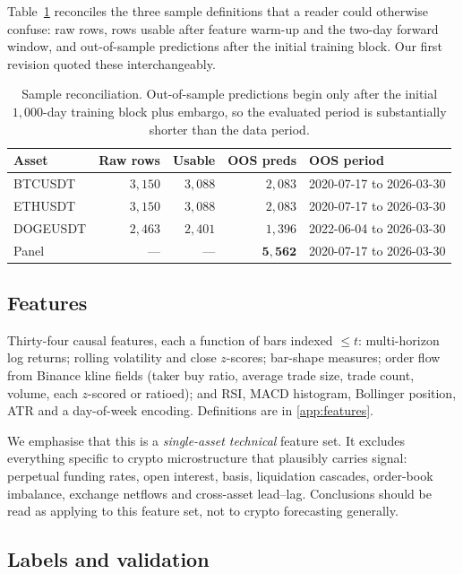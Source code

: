 \documentclass[preprint,12pt,authoryear]{elsarticle}
\begin{document}
Table~\ref{tab:data} reconciles the three sample definitions that a reader could
otherwise confuse: raw rows, rows usable after feature warm-up and the two-day
forward window, and out-of-sample predictions after the initial training block.
Our first revision quoted these interchangeably.

\begin{table}[t]\centering\small
\caption{Sample reconciliation. Out-of-sample predictions begin only after the
initial $1{,}000$-day training block plus embargo, so the evaluated period is
substantially shorter than the data period.}
\label{tab:data}
\begin{tabular}{@{}lrrrl@{}}
\toprule
Asset & Raw rows & Usable & OOS preds & OOS period \\
\midrule
BTCUSDT  & $3{,}150$ & $3{,}088$ & $2{,}083$ & 2020-07-17 to 2026-03-30 \\
ETHUSDT  & $3{,}150$ & $3{,}088$ & $2{,}083$ & 2020-07-17 to 2026-03-30 \\
DOGEUSDT & $2{,}463$ & $2{,}401$ & $1{,}396$ & 2022-06-04 to 2026-03-30 \\
\midrule
Panel    & --- & --- & $\mathbf{5{,}562}$ & 2020-07-17 to 2026-03-30 \\
\bottomrule
\end{tabular}
\end{table}

\subsection{Features}

Thirty-four causal features, each a function of bars indexed $\le t$: multi-horizon
log returns; rolling volatility and close $z$-scores; bar-shape measures; order
flow from Binance kline fields (taker buy ratio, average trade size, trade count,
volume, each $z$-scored or ratioed); and RSI, MACD histogram, Bollinger position,
ATR and a day-of-week encoding. Definitions are in \ref{app:features}.

We emphasise that this is a \emph{single-asset technical} feature set. It
excludes everything specific to crypto microstructure that plausibly carries
signal: perpetual funding rates, open interest, basis, liquidation cascades,
order-book imbalance, exchange netflows and cross-asset lead--lag. Conclusions
should be read as applying to this feature set, not to crypto forecasting
generally.

\subsection{Labels and validation}
\end{document}
